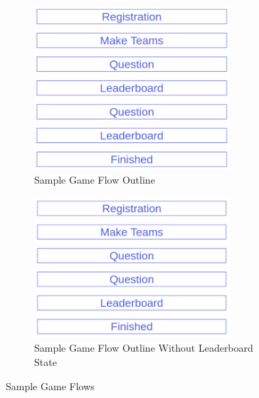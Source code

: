 \documentclass{article}
\begin{document}
            \begin{figure}[ht]
                \centering
                \begin{subfigure}[b]{0.45\textwidth}
                    \includegraphics[width=0.8\textwidth]{images/architecture-flow.png}
                    \caption{Sample Game Flow Outline}
                    \label{fig:architecutre-flow}
                \end{subfigure}
                \begin{subfigure}[b]{0.45\textwidth}
                    \includegraphics[width=0.8\textwidth]{images/architecture-flow2.png}
                    \caption{Sample Game Flow Outline Without Leaderboard State}
                    \label{fig:architecutre-flow2}
                \end{subfigure}
                \caption{Sample Game Flows}\label{fig:architecutre-game_flows}
            \end{figure}
\end{document}

